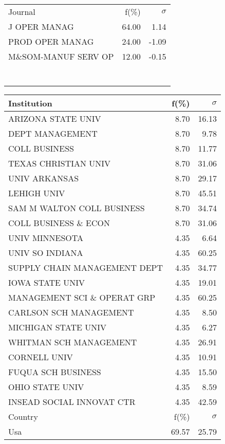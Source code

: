 \documentclass[a4paper,11pt]{report}
\begin{document}
\begin{landscape}
\begin{table}[!ht]
{\begin{tabular}{|l r  r|}
 &  & \\
\hline
\hline
Journal & f(\%) & $\sigma$\\
\hline
J OPER MANAG & 64.00 & 1.14\\
PROD OPER MANAG & 24.00 & -1.09\\
M\&SOM-MANUF SERV OP & 12.00 & -0.15\\
 &  & \\
 &  & \\
 &  & \\
 &  & \\
 &  & \\
 &  & \\
 &  & \\
\hline
\end{tabular}
}
{\scriptsize\begin{tabular}{|l r r|}
\hline
Institution & f(\%) & $\sigma$\\
\hline
ARIZONA STATE UNIV & 8.70 & 16.13\\
DEPT MANAGEMENT & 8.70 & 9.78\\
COLL BUSINESS & 8.70 & 11.77\\
TEXAS CHRISTIAN UNIV & 8.70 & 31.06\\
UNIV ARKANSAS & 8.70 & 29.17\\
LEHIGH UNIV & 8.70 & 45.51\\
SAM M WALTON COLL BUSINESS & 8.70 & 34.74\\
COLL BUSINESS \& ECON & 8.70 & 31.06\\
UNIV MINNESOTA & 4.35 & 6.64\\
UNIV SO INDIANA & 4.35 & 60.25\\
SUPPLY CHAIN MANAGEMENT DEPT & 4.35 & 34.77\\
IOWA STATE UNIV & 4.35 & 19.01\\
MANAGEMENT SCI \& OPERAT GRP & 4.35 & 60.25\\
CARLSON SCH MANAGEMENT & 4.35 & 8.50\\
MICHIGAN STATE UNIV & 4.35 & 6.27\\
WHITMAN SCH MANAGEMENT & 4.35 & 26.91\\
CORNELL UNIV & 4.35 & 10.91\\
FUQUA SCH BUSINESS & 4.35 & 15.50\\
OHIO STATE UNIV & 4.35 & 8.59\\
INSEAD SOCIAL INNOVAT CTR & 4.35 & 42.59\\
\hline
\hline
Country & f(\%) & $\sigma$\\
\hline
Usa & 69.57 & 25.79\\

\end{tabular}}
\end{table}
\end{landscape}
\end{document}
